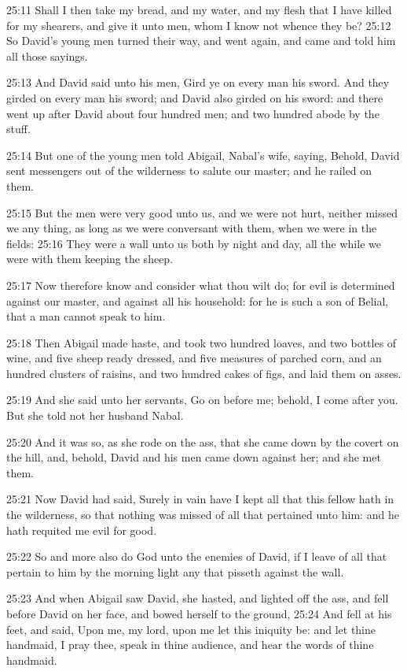 25:11 Shall I then take my bread, and my water, and my flesh that I have killed for my shearers, and give it unto men, whom I know not whence they be?  25:12 So David's young men turned their way, and went again, and came and told him all those sayings.

25:13 And David said unto his men, Gird ye on every man his sword. And they girded on every man his sword; and David also girded on his sword: and there went up after David about four hundred men; and two hundred abode by the stuff.

25:14 But one of the young men told Abigail, Nabal's wife, saying, Behold, David sent messengers out of the wilderness to salute our master; and he railed on them.

25:15 But the men were very good unto us, and we were not hurt, neither missed we any thing, as long as we were conversant with them, when we were in the fields: 25:16 They were a wall unto us both by night and day, all the while we were with them keeping the sheep.

25:17 Now therefore know and consider what thou wilt do; for evil is determined against our master, and against all his household: for he is such a son of Belial, that a man cannot speak to him.

25:18 Then Abigail made haste, and took two hundred loaves, and two bottles of wine, and five sheep ready dressed, and five measures of parched corn, and an hundred clusters of raisins, and two hundred cakes of figs, and laid them on asses.

25:19 And she said unto her servants, Go on before me; behold, I come after you. But she told not her husband Nabal.

25:20 And it was so, as she rode on the ass, that she came down by the covert on the hill, and, behold, David and his men came down against her; and she met them.

25:21 Now David had said, Surely in vain have I kept all that this fellow hath in the wilderness, so that nothing was missed of all that pertained unto him: and he hath requited me evil for good.

25:22 So and more also do God unto the enemies of David, if I leave of all that pertain to him by the morning light any that pisseth against the wall.

25:23 And when Abigail saw David, she hasted, and lighted off the ass, and fell before David on her face, and bowed herself to the ground, 25:24 And fell at his feet, and said, Upon me, my lord, upon me let this iniquity be: and let thine handmaid, I pray thee, speak in thine audience, and hear the words of thine handmaid.

